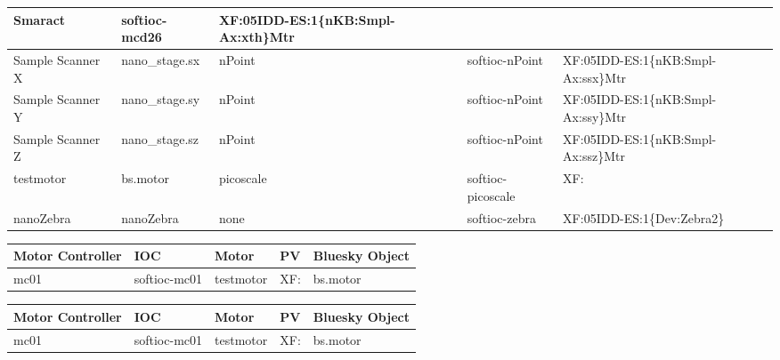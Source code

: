 \documentclass[letterpaper,10pt,english]{sphinxmanual}
\begin{document}
\begin{savenotes}
\begin{tabulary}{\linewidth}[t]{|T|T|T|T|T|}
Smaract
&
softioc-mcd26
&
XF:05IDD-ES:1\{nKB:Smpl-Ax:xth\}Mtr
\\
\hline
Sample Scanner X
&
nano\_stage.sx
&
nPoint
&
softioc-nPoint
&
XF:05IDD-ES:1\{nKB:Smpl-Ax:ssx\}Mtr
\\
\hline
Sample Scanner Y
&
nano\_stage.sy
&
nPoint
&
softioc-nPoint
&
XF:05IDD-ES:1\{nKB:Smpl-Ax:ssy\}Mtr
\\
\hline
Sample Scanner Z
&
nano\_stage.sz
&
nPoint
&
softioc-nPoint
&
XF:05IDD-ES:1\{nKB:Smpl-Ax:ssz\}Mtr
\\
\hline
testmotor
&
bs.motor
&
picoscale
&
softioc-picoscale
&
XF:
\\
\hline
nanoZebra
&
nanoZebra
&
none
&
softioc-zebra
&
XF:05IDD-ES:1\{Dev:Zebra2\}
\\
\hline
\end{tabulary}
\par
\sphinxattableend\end{savenotes}


\begin{savenotes}\sphinxattablestart
\raggedright
{}
\sphinxthecaptionisattop
{}\label{\detokenize{staff:xf05idd-det1}}
\sphinxaftertopcaption
\begin{tabulary}{\linewidth}[t]{|T|T|T|T|T|}
\hline
\sphinxstyletheadfamily 
Motor Controller
&\sphinxstyletheadfamily 
IOC
&\sphinxstyletheadfamily 
Motor
&\sphinxstyletheadfamily 
PV
&\sphinxstyletheadfamily 
Bluesky Object
\\
\hline
mc01
&
softioc-mc01
&
testmotor
&
XF:
&
bs.motor
\\
\hline
\end{tabulary}
\par
\sphinxattableend\end{savenotes}


\begin{savenotes}\sphinxattablestart
\raggedright
{}
\sphinxthecaptionisattop
{}\label{\detokenize{staff:xf05idd-det2}}
\sphinxaftertopcaption
\begin{tabulary}{\linewidth}[t]{|T|T|T|T|T|}
\hline
\sphinxstyletheadfamily 
Motor Controller
&\sphinxstyletheadfamily 
IOC
&\sphinxstyletheadfamily 
Motor
&\sphinxstyletheadfamily 
PV
&\sphinxstyletheadfamily 
Bluesky Object
\\
\hline
mc01
&
softioc-mc01
&
testmotor
&
XF:
&
bs.motor
\\
\hline
\end{tabulary}
\par
\sphinxattableend\end{savenotes}
\end{document}
